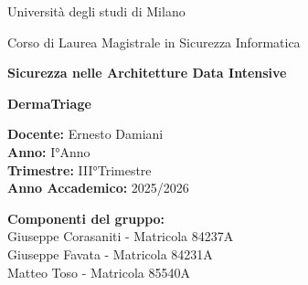 \documentclass[12pt,a4paper]{article} %
\theoremstyle{appunti}
\theoremstyle{esempiostyle}
\newcommand{\TitoloTesina}{DermaTriage}
\newcommand{\University}{Università degli studi di Milano}
\newcommand{\Corso}{Sicurezza nelle Architetture Data Intensive}
\newcommand{\Docente}{Ernesto Damiani}
\newcommand{\AnnoCorso}{I°Anno}
\newcommand{\TrimestreCorso}{III°Trimestre}
\newcommand{\ElencoStudenti}{%
  \textbf{Componenti del gruppo:}\\[2pt]
  Giuseppe Corasaniti - Matricola 84237A \\
  Giuseppe Favata - Matricola 84231A \\
  Matteo Toso - Matricola 85540A%
}
\newcommand{\AnnoAccademico}{2025/2026}
\begin{document}
\begin{titlepage}
    \centering

    \vspace*{2cm}

    {\Large \University \par}
    \vspace{0.5cm}
    {\large Corso di Laurea Magistrale in Sicurezza Informatica \par}

    \vspace{2cm}

    {\Large \textbf{\Corso} \par}

    \vspace{1cm}

    {\Huge \textbf{\TitoloTesina} \par}

    \vspace{2cm}

    \begin{flushleft}
        \textbf{Docente:} \Docente \\
        \textbf{Anno:} \AnnoCorso \\
        \textbf{Trimestre:} \TrimestreCorso \\
        \textbf{Anno Accademico:} \AnnoAccademico
    \end{flushleft}

    \vspace{2cm}

    \begin{flushright}
        \ElencoStudenti
    \end{flushright}

    \vfill

\end{titlepage}

\clearpage
\tableofcontents

\clearpage









\clearpage
\end{document}
